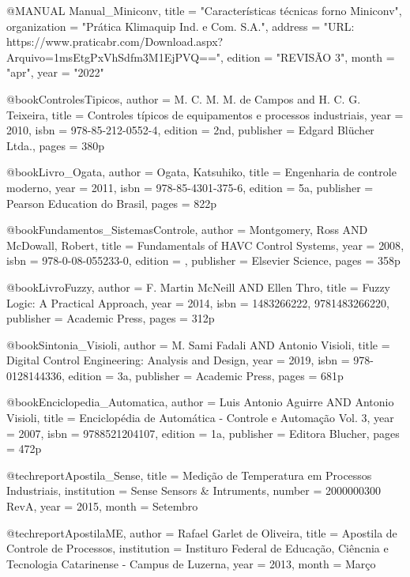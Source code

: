
@MANUAL {Manual_Miniconv, title = "Características técnicas forno Miniconv", organization = "Prática Klimaquip Ind. e Com. S.A.", address = "URL: https://www.praticabr.com/Download.aspx?Arquivo=1msEtgPxVhSdfm3M1EjPVQ==", edition = "REVISÃO 3", month = "apr", year = "2022"}

@book{ControlesTipicos,
 author = {M. C. M. M. de Campos and H. C. G. Teixeira}, title = {Controles típicos de equipamentos e processos industriais}, year = {2010}, isbn = {978-85-212-0552-4}, edition = {2nd}, publisher = {Edgard Blücher Ltda.}, pages = 380p}

@book{Livro_Ogata,
 author = {Ogata, Katsuhiko}, title = {Engenharia de controle moderno}, year = {2011}, isbn = {978-85-4301-375-6}, edition = {5a}, publisher = {Pearson Education do Brasil}, pages = 822p}

@book{Fundamentos_SistemasControle,
 author = {Montgomery, Ross AND McDowall, Robert}, title = {Fundamentals of HAVC Control Systems}, year = {2008}, isbn = {978-0-08-055233-0}, edition = {}, publisher = {Elsevier Science}, pages = 358p}

@book{LivroFuzzy,
 author = {F. Martin McNeill AND Ellen Thro}, title = {Fuzzy Logic: A Practical Approach}, year = {2014}, isbn = {1483266222, 9781483266220}, publisher = {Academic Press}, pages = 312p}

@book{Sintonia_Visioli,
 author = {M. Sami Fadali AND Antonio Visioli}, title = {Digital Control Engineering: Analysis and Design}, year = {2019}, isbn = {978-0128144336}, edition = {3a}, publisher = {Academic Press}, pages = 681p}

@book{Enciclopedia_Automatica,
 author = {Luis Antonio Aguirre AND Antonio Visioli}, title = {Enciclopédia de Automática - Controle e Automação Vol. 3}, year = {2007}, isbn = {9788521204107}, edition = {1a}, publisher = {Editora Blucher}, pages = 472p}

@techreport{Apostila_Sense,
    title = {Medição de Temperatura em Processos Industriais}, institution = {Sense Sensors \& Intruments}, number = {2000000300 RevA}, year = {2015}, month = {Setembro}}

@techreport{ApostilaME,
    author = {Rafael Garlet de Oliveira}, title = {Apostila de Controle de Processos}, institution = {Instituro Federal de Educação, Ciêncnia e Tecnologia Catarinense - Campus de Luzerna}, year = {2013}, month = {Março}}

